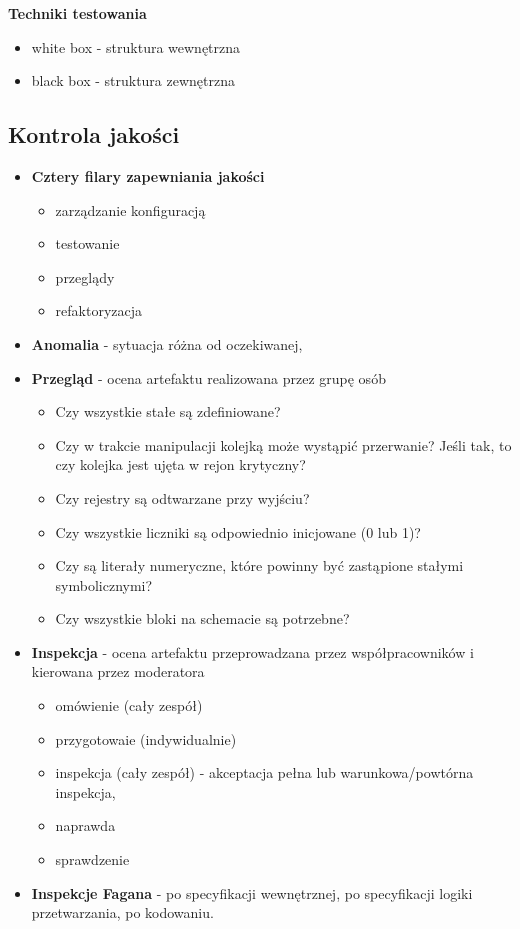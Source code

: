 \documentclass[a4paper]{article}
\begin{document}
    \textbf{Techniki testowania}
    \begin{itemize}
        \item white box - struktura wewnętrzna
        \item black box - struktura zewnętrzna
    \end{itemize}


    \subsection{Kontrola jakości}

    \begin{itemize}
        \item \textbf{Cztery filary zapewniania jakości}
        \begin{itemize}
            \item zarządzanie konfiguracją
            \item testowanie
            \item przeglądy
            \item refaktoryzacja
        \end{itemize}
        \item \textbf{Anomalia} - sytuacja różna od oczekiwanej,
        \item \textbf{Przegląd} - ocena artefaktu realizowana przez grupę osób
        \begin{itemize}
            \item Czy wszystkie stałe są zdefiniowane?
            \item Czy w trakcie manipulacji kolejką może wystąpić przerwanie? Jeśli tak, to czy kolejka jest
            ujęta w rejon krytyczny?
            \item Czy rejestry są odtwarzane przy wyjściu?
            \item Czy wszystkie liczniki są odpowiednio inicjowane (0 lub 1)?
            \item Czy są literały numeryczne, które powinny być zastąpione stałymi symbolicznymi?
            \item Czy wszystkie bloki na schemacie są potrzebne?
        \end{itemize}

        \item \textbf{Inspekcja} - ocena artefaktu przeprowadzana przez współpracowników i kierowana przez moderatora
        \begin{itemize}
            \item omówienie (cały zespół)
            \item przygotowaie (indywidualnie)
            \item inspekcja (cały zespół) - akceptacja pełna lub warunkowa/powtórna inspekcja,
            \item naprawda
            \item sprawdzenie
        \end{itemize}
        \item \textbf{Inspekcje Fagana} - po specyfikacji wewnętrznej, po specyfikacji logiki przetwarzania, po kodowaniu.
    \end{itemize}
\end{document}
